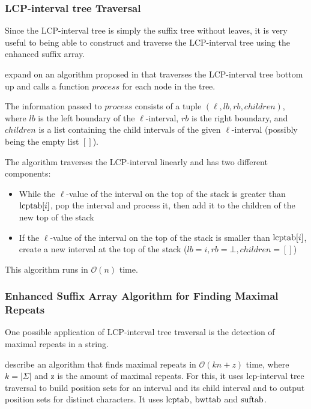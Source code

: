 \documentclass[a4paper,10pt]{article}
\begin{document}
\subsubsection*{LCP-interval tree Traversal}

Since the LCP-interval tree is simply the suffix tree without leaves, it
is very useful to being able to construct and traverse the LCP-interval
tree using the enhanced suffix array.

\citealt{abouelhoda2002enhanced} expand on an algorithm proposed in
\citealt{kasai2001linear} that traverses the LCP-interval tree bottom
up and calls a function $process$ for each node in the tree.

The information passed to $process$ consists of a tuple $(\ell, lb, rb,
children)$, where $lb$ is the left boundary of the $\ell$-interval,
$rb$ is the right boundary, and $children$ is a list containing the
child intervals of the given $\ell$-interval (possibly being the empty
list $[]$).

The algorithm traverses the LCP-interval linearly and has two different
components:

\begin{itemize}
\item While the $\ell$-value of the interval on the top of the stack
is greater than $\hbox{lcptab}[i]$, pop the interval and process it,
then add it to the children of the new top of the stack
\item If the $\ell$-value of the interval on the top of the stack is
smaller than $\hbox{lcptab}[i]$, create a new interval at the top of
the stack ($lb=i, rb=\bot, children=[]$)
\end{itemize}

This algorithm runs in $\mathcal{O}(n)$ time.

\subsubsection*{Enhanced Suffix Array Algorithm for Finding Maximal Repeats}

One possible application of LCP-interval tree traversal is the detection
of maximal repeats in a string.

\citealt{abouelhoda2002enhanced} describe an algorithm that finds maximal
repeats in $\mathcal{O}(kn+z)$ time, where $k=|\Sigma|$ and z is the
amount of maximal repeats. For this, it uses lcp-interval tree traversal
to build position sets for an interval and its child interval and to
output position sets for distinct characters. It uses $\hbox{lcptab}$,
$\hbox{bwttab}$ and $\hbox{suftab}$.
\end{document}
